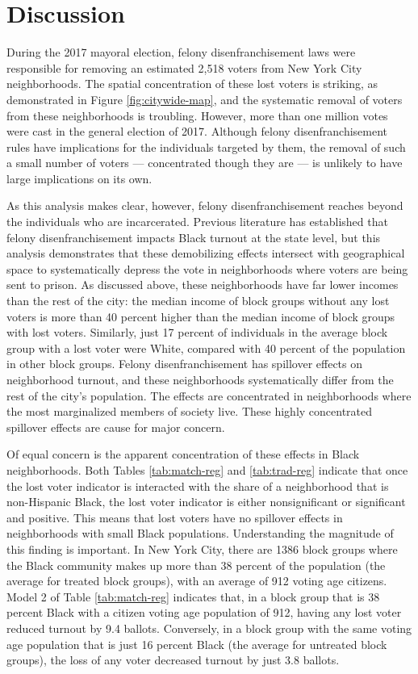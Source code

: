 \documentclass[12pt,]{article}
\begin{document}
\hypertarget{discussion}{%
\section*{Discussion}\label{discussion}}

During the 2017 mayoral election, felony disenfranchisement laws were responsible for removing an estimated 2,518 voters from New York City neighborhoods. The spatial concentration of these lost voters is striking, as demonstrated in Figure \ref{fig:citywide-map}, and the systematic removal of voters from these neighborhoods is troubling. However, more than one million votes were cast in the general election of 2017. Although felony disenfranchisement rules have implications for the individuals targeted by them, the removal of such a small number of voters --- concentrated though they are --- is unlikely to have large implications on its own.

As this analysis makes clear, however, felony disenfranchisement reaches beyond the individuals who are incarcerated. Previous literature has established that felony disenfranchisement impacts Black turnout at the state level, but this analysis demonstrates that these demobilizing effects intersect with geographical space to systematically depress the vote in neighborhoods where voters are being sent to prison. As discussed above, these neighborhoods have far lower incomes than the rest of the city: the median income of block groups without any lost voters is more than 40 percent higher than the median income of block groups with lost voters. Similarly, just 17 percent of individuals in the average block group with a lost voter were White, compared with 40 percent of the population in other block groups. Felony disenfranchisement has spillover effects on neighborhood turnout, and these neighborhoods systematically differ from the rest of the city's population. The effects are concentrated in neighborhoods where the most marginalized members of society live. These highly concentrated spillover effects are cause for major concern.

Of equal concern is the apparent concentration of these effects in Black neighborhoods. Both Tables \ref{tab:match-reg} and \ref{tab:trad-reg} indicate that once the lost voter indicator is interacted with the share of a neighborhood that is non-Hispanic Black, the lost voter indicator is either nonsignificant or significant and positive. This means that lost voters have no spillover effects in neighborhoods with small Black populations. Understanding the magnitude of this finding is important. In New York City, there are 1386 block groups where the Black community makes up more than 38 percent of the population (the average for treated block groups), with an average of 912 voting age citizens. Model 2 of Table \ref{tab:match-reg} indicates that, in a block group that is 38 percent Black with a citizen voting age population of 912, having any lost voter reduced turnout by 9.4 ballots. Conversely, in a block group with the same voting age population that is just 16 percent Black (the average for untreated block groups), the loss of any voter decreased turnout by just 3.8 ballots.
\end{document}
